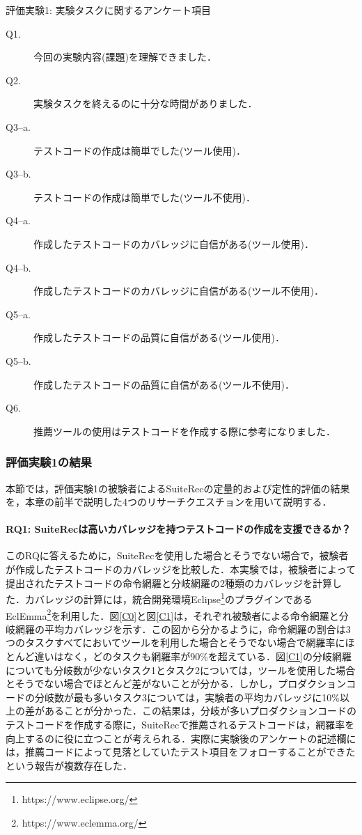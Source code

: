\documentclass[12pt]{jarticle} %
\begin{document}
\begin{itembox}[l]{評価実験1: 実験タスクに関するアンケート項目}
\begin{description}
\item[Q1.]今回の実験内容(課題)を理解できました．
\item[Q2.]実験タスクを終えるのに十分な時間がありました．
\item[Q3--a.]テストコードの作成は簡単でした(ツール使用)．
\item[Q3--b.]テストコードの作成は簡単でした(ツール不使用)．
\item[Q4--a.]作成したテストコードのカバレッジに自信がある(ツール使用)．
\item[Q4--b.]作成したテストコードのカバレッジに自信がある(ツール不使用)．
\item[Q5--a.]作成したテストコードの品質に自信がある(ツール使用)．
\item[Q5--b.]作成したテストコードの品質に自信がある(ツール不使用)．
\item[Q6.]推薦ツールの使用はテストコードを作成する際に参考になりました．
\end{description}

\end{itembox}

\newpage
\subsubsection{評価実験1の結果}
本節では，評価実験1の被験者による{\sf SuiteRec}の定量的および定性的評価の結果を，本章の前半で説明した4つのリサーチクエスチョンを用いて説明する．

\paragraph{RQ1: {\sf SuiteRec}は高いカバレッジを持つテストコードの作成を支援できるか？}このRQに答えるために，{\sf SuiteRec}を使用した場合とそうでない場合で，被験者が作成したテストコードのカバレッジを比較した．本実験では，被験者によって提出されたテストコードの命令網羅と分岐網羅の2種類のカバレッジを計算した．カバレッジの計算には，統合開発環境Eclipse\footnote{https://www.eclipse.org/}のプラグインであるEclEmma\footnote{https://www.eclemma.org/}を利用した．図\ref{C0}と図\ref{C1}は，それぞれ被験者による命令網羅と分岐網羅の平均カバレッジを示す．この図から分かるように，命令網羅の割合は3つのタスクすべてにおいてツールを利用した場合とそうでない場合で網羅率にほとんど違いはなく，どのタスクも網羅率が90\%を超えている．図\ref{C1}の分岐網羅についても分岐数が少ないタスク1とタスク2については，ツールを使用した場合とそうでない場合でほとんど差がないことが分かる．しかし，プロダクションコードの分岐数が最も多いタスク3については，実験者の平均カバレッジに10\%以上の差があることが分かった．この結果は，分岐が多いプロダクションコードのテストコードを作成する際に，{\sf SuiteRec}で推薦されるテストコードは，網羅率を向上するのに役に立つことが考えられる．実際に実験後のアンケートの記述欄には，推薦コードによって見落としていたテスト項目をフォローすることができたという報告が複数存在した．
\end{document}
